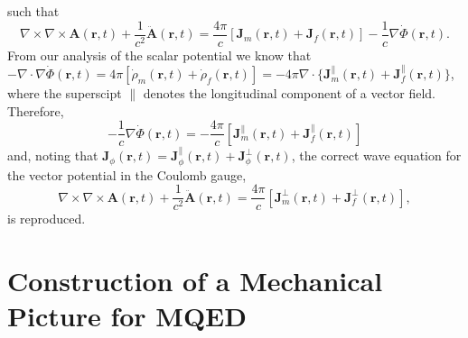\documentclass{article}
\begin{document}
such that
\begin{equation}
\nabla\times\nabla\times\mathbf{A}(\mathbf{r},t) + \frac{1}{c^2}\ddot{\mathbf{A}}(\mathbf{r},t) = \frac{4\pi}{c}\left[\mathbf{J}_m(\mathbf{r},t) + \mathbf{J}_f(\mathbf{r},t)\right] - \frac{1}{c}\nabla\dot{\Phi}(\mathbf{r},t).
\end{equation}
From our analysis of the scalar potential we know that $-\nabla\cdot\nabla\dot{\Phi}(\mathbf{r},t) = 4\pi\left[\dot{\rho}_m(\mathbf{r},t) + \dot{\rho}_f(\mathbf{r},t)\right] = -4\pi\nabla\cdot\{\mathbf{J}_m^\parallel(\mathbf{r},t) + \mathbf{J}_f^\parallel(\mathbf{r},t)\}$, where the superscipt $\parallel$ denotes the longitudinal component of a vector field. Therefore,
\begin{equation}
-\frac{1}{c}\nabla\dot{\Phi}(\mathbf{r},t) = -\frac{4\pi}{c}\left[\mathbf{J}_m^\parallel(\mathbf{r},t) + \mathbf{J}_f^\parallel(\mathbf{r},t)\right]
\end{equation}
and, noting that $\mathbf{J}_\phi(\mathbf{r},t) = \mathbf{J}_\phi^\parallel(\mathbf{r},t) + \mathbf{J}_\phi^\perp(\mathbf{r},t)$, the correct wave equation for the vector potential in the Coulomb gauge,
\begin{equation}\label{eq:vectorPotentialWaveEq}
\nabla\times\nabla\times\mathbf{A}(\mathbf{r},t) + \frac{1}{c^2}\ddot{\mathbf{A}}(\mathbf{r},t) = \frac{4\pi}{c}\left[\mathbf{J}^\perp_{m}(\mathbf{r},t) + \mathbf{J}^\perp_{f}(\mathbf{r},t)\right],
\end{equation}
is reproduced.



















\section{Construction of a Mechanical Picture for MQED}
\end{document}
